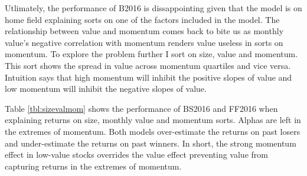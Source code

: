 Utlimately, the performance of B2016 is dissappointing given that the model is on home
field explaining sorts on one of the factors included in the model. The relationship
between value and momentum comes back to bite us as monthly value's negative correlation
with momentum renders value useless in sorts on momentum. To explore the problem further I
sort on size, value and momentum. This sort shows the spread in value across momentum
quartiles and vice versa. Intuition says that high momentum will inhibit the positive slopes
of value and low momentum will inhibit the negative slopes of value.


Table \ref{tbl:sizevalmom} shows the performance of BS2016 and FF2016 when explaining
returns on size, monthly value and momentum sorts. Alphas are left in the extremes of
momentum. Both models over-estimate the returns on past losers and under-estimate the
returns on past winners. In short, the strong momentum effect in low-value stocks
overrides the value effect preventing value from capturing returns in the extremes of
momentum.


